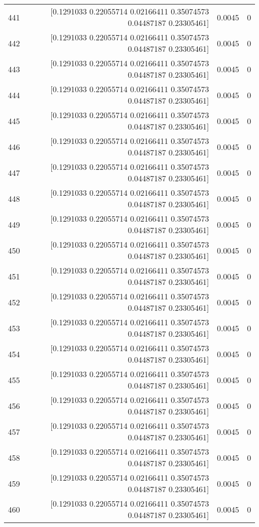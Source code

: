 \begin{longtable}{lrrr}
441 & [0.1291033  0.22055714 0.02166411 0.35074573 0.04487187 0.23305461] & 0.0045 & 0 \\
442 & [0.1291033  0.22055714 0.02166411 0.35074573 0.04487187 0.23305461] & 0.0045 & 0 \\
443 & [0.1291033  0.22055714 0.02166411 0.35074573 0.04487187 0.23305461] & 0.0045 & 0 \\
444 & [0.1291033  0.22055714 0.02166411 0.35074573 0.04487187 0.23305461] & 0.0045 & 0 \\
445 & [0.1291033  0.22055714 0.02166411 0.35074573 0.04487187 0.23305461] & 0.0045 & 0 \\
446 & [0.1291033  0.22055714 0.02166411 0.35074573 0.04487187 0.23305461] & 0.0045 & 0 \\
447 & [0.1291033  0.22055714 0.02166411 0.35074573 0.04487187 0.23305461] & 0.0045 & 0 \\
448 & [0.1291033  0.22055714 0.02166411 0.35074573 0.04487187 0.23305461] & 0.0045 & 0 \\
449 & [0.1291033  0.22055714 0.02166411 0.35074573 0.04487187 0.23305461] & 0.0045 & 0 \\
450 & [0.1291033  0.22055714 0.02166411 0.35074573 0.04487187 0.23305461] & 0.0045 & 0 \\
451 & [0.1291033  0.22055714 0.02166411 0.35074573 0.04487187 0.23305461] & 0.0045 & 0 \\
452 & [0.1291033  0.22055714 0.02166411 0.35074573 0.04487187 0.23305461] & 0.0045 & 0 \\
453 & [0.1291033  0.22055714 0.02166411 0.35074573 0.04487187 0.23305461] & 0.0045 & 0 \\
454 & [0.1291033  0.22055714 0.02166411 0.35074573 0.04487187 0.23305461] & 0.0045 & 0 \\
455 & [0.1291033  0.22055714 0.02166411 0.35074573 0.04487187 0.23305461] & 0.0045 & 0 \\
456 & [0.1291033  0.22055714 0.02166411 0.35074573 0.04487187 0.23305461] & 0.0045 & 0 \\
457 & [0.1291033  0.22055714 0.02166411 0.35074573 0.04487187 0.23305461] & 0.0045 & 0 \\
458 & [0.1291033  0.22055714 0.02166411 0.35074573 0.04487187 0.23305461] & 0.0045 & 0 \\
459 & [0.1291033  0.22055714 0.02166411 0.35074573 0.04487187 0.23305461] & 0.0045 & 0 \\
460 & [0.1291033  0.22055714 0.02166411 0.35074573 0.04487187 0.23305461] & 0.0045 & 0 \\

\end{longtable}
